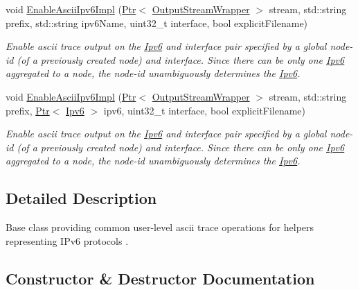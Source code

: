 \begin{DoxyCompactItemize}
void \hyperlink{classns3_1_1AsciiTraceHelperForIpv6_a094f1904240474907bd4a0225eb9fa67}{Enable\+Ascii\+Ipv6\+Impl} (\hyperlink{classns3_1_1Ptr}{Ptr}$<$ \hyperlink{classns3_1_1OutputStreamWrapper}{Output\+Stream\+Wrapper} $>$ stream, std\+::string prefix, std\+::string ipv6\+Name, uint32\+\_\+t interface, bool explicit\+Filename)
\begin{DoxyCompactList}\small\item\em Enable ascii trace output on the \hyperlink{classns3_1_1Ipv6}{Ipv6} and interface pair specified by a global node-\/id (of a previously created node) and interface. Since there can be only one \hyperlink{classns3_1_1Ipv6}{Ipv6} aggregated to a node, the node-\/id unambiguously determines the \hyperlink{classns3_1_1Ipv6}{Ipv6}. \end{DoxyCompactList}\item 
void \hyperlink{classns3_1_1AsciiTraceHelperForIpv6_ae3f09c8fa878354578deee247fd06455}{Enable\+Ascii\+Ipv6\+Impl} (\hyperlink{classns3_1_1Ptr}{Ptr}$<$ \hyperlink{classns3_1_1OutputStreamWrapper}{Output\+Stream\+Wrapper} $>$ stream, std\+::string prefix, \hyperlink{classns3_1_1Ptr}{Ptr}$<$ \hyperlink{classns3_1_1Ipv6}{Ipv6} $>$ ipv6, uint32\+\_\+t interface, bool explicit\+Filename)
\begin{DoxyCompactList}\small\item\em Enable ascii trace output on the \hyperlink{classns3_1_1Ipv6}{Ipv6} and interface pair specified by a global node-\/id (of a previously created node) and interface. Since there can be only one \hyperlink{classns3_1_1Ipv6}{Ipv6} aggregated to a node, the node-\/id unambiguously determines the \hyperlink{classns3_1_1Ipv6}{Ipv6}. \end{DoxyCompactList}\end{DoxyCompactItemize}


\subsection{Detailed Description}
Base class providing common user-\/level ascii trace operations for helpers representing I\+Pv6 protocols . 

\subsection{Constructor \& Destructor Documentation}
